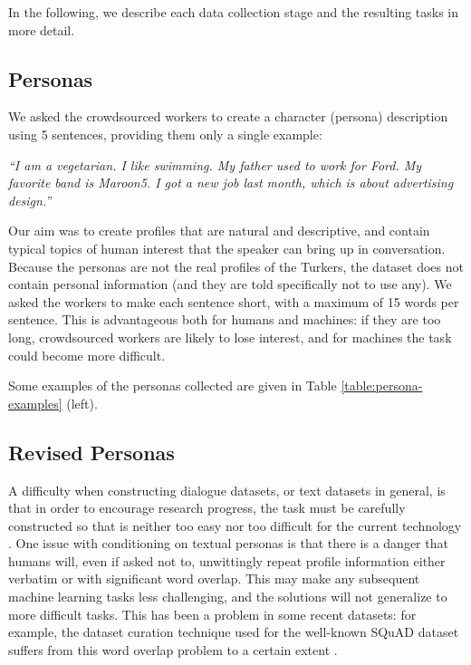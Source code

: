 \documentclass[11pt,a4paper]{article}
\begin{document}
In the following, we describe each data collection stage and the resulting tasks in more detail.
\fi 





\subsection{Personas}

We asked the crowdsourced workers to create a character (persona) description using 5 sentences, providing them only a single example:

{\em ``I am a vegetarian. I like swimming.  My father used to work for Ford.  My favorite band is Maroon5. I got a new job last month, which is about advertising design.''}

Our aim was to create profiles that are natural and descriptive, and contain typical topics of human interest that the speaker 
can bring up in conversation. Because the personas are not the real profiles of the Turkers,
  the dataset does not contain personal information (and they are told specifically not to use any).
We asked the workers to make each sentence short, with a maximum of 15 words per sentence.
This is advantageous both for humans and machines: if they are too long, crowdsourced workers are likely to lose interest, and for machines the task could become more difficult.

Some examples of the  personas collected are given in Table \ref{table:persona-examples} (left).

\subsection{Revised Personas}

A difficulty when constructing dialogue datasets, or text datasets in general, is that in order to
encourage research progress, the task must be carefully constructed so that is neither too
 easy nor too difficult for the current technology 
 \citep{voorhees1999trec}.
One issue with conditioning on textual personas is that there is a danger that humans will, even if asked not to,
unwittingly repeat profile information either verbatim or with significant word overlap.
This may make any subsequent machine learning tasks less challenging, and the solutions will not generalize to
more difficult tasks. This has been a problem in some recent datasets:
for example, the dataset curation technique used for the well-known SQuAD dataset
suffers from this word overlap problem to a certain extent \citep{chen2017reading}.
\end{document}
